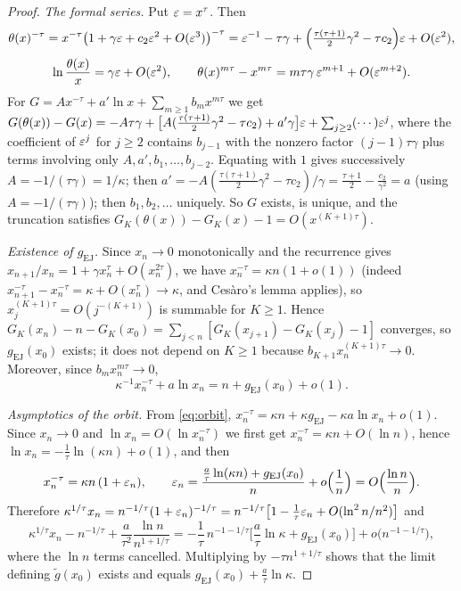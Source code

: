 \begin{proof}
\emph{The formal series.} Put $\varepsilon=x^\tau$. Then
\[
\theta(x)^{-\tau}=x^{-\tau}\big(1+\gamma\varepsilon+c_2\varepsilon^2+O(\varepsilon^3)\big)^{-\tau}=\varepsilon^{-1}-\tau\gamma+\Big(\tfrac{\tau(\tau+1)}2\gamma^2-\tau c_2\Big)\varepsilon+O(\varepsilon^2),
\]
\[
\ln\frac{\theta(x)}{x}=\gamma\varepsilon+O(\varepsilon^2),\qquad \theta(x)^{m\tau}-x^{m\tau}=m\tau\gamma\,\varepsilon^{m+1}+O(\varepsilon^{m+2}).
\]
For $G=Ax^{-\tau}+a'\ln x+\sum_{m\ge1}b_mx^{m\tau}$ we get $G(\theta(x))-G(x)=-A\tau\gamma+\big[A(\tfrac{\tau(\tau+1)}2\gamma^2-\tau c_2)+a'\gamma\big]\varepsilon+\sum_{j\ge2}(\cdots)\varepsilon^j$, where the coefficient of $\varepsilon^j$ for $j\ge2$ contains $b_{j-1}$ with the nonzero factor $(j-1)\tau\gamma$ plus terms involving only $A,a',b_1,\dots,b_{j-2}$. Equating with $1$ gives successively $A=-1/(\tau\gamma)=1/\kappa$; then $a'=-A(\tfrac{\tau(\tau+1)}2\gamma^2-\tau c_2)/\gamma=\tfrac{\tau+1}2-\tfrac{c_2}{\gamma^2}=a$ (using $A=-1/(\tau\gamma)$); then $b_1,b_2,\dots$ uniquely. So $G$ exists, is unique, and the truncation satisfies $G_K(\theta(x))-G_K(x)-1=O(x^{(K+1)\tau})$.

\emph{Existence of $g_{\mathrm{EJ}}$.} Since $x_n\to0$ monotonically and the recurrence gives $x_{n+1}/x_n=1+\gamma x_n^\tau+O(x_n^{2\tau})$, we have $x_n^{-\tau}=\kappa n(1+o(1))$ (indeed $x_{n+1}^{-\tau}-x_n^{-\tau}=\kappa+O(x_n^\tau)\to\kappa$, and Ces\`aro's lemma applies), so $x_j^{(K+1)\tau}=O(j^{-(K+1)})$ is summable for $K\ge1$. Hence $G_K(x_n)-n-G_K(x_0)=\sum_{j<n}[G_K(x_{j+1})-G_K(x_j)-1]$ converges, so $g_{\mathrm{EJ}}(x_0)$ exists; it does not depend on $K\ge1$ because $b_{K+1}x_n^{(K+1)\tau}\to0$. Moreover, since $b_mx_n^{m\tau}\to0$,
\begin{equation}\label{eq:orbit}
\kappa^{-1}x_n^{-\tau}+a\ln x_n=n+g_{\mathrm{EJ}}(x_0)+o(1).
\end{equation}

\emph{Asymptotics of the orbit.} From \eqref{eq:orbit}, $x_n^{-\tau}=\kappa n+\kappa g_{\mathrm{EJ}}-\kappa a\ln x_n+o(1)$. Since $x_n\to0$ and $\ln x_n=O(\ln x_n^{-\tau})$ we first get $x_n^{-\tau}=\kappa n+O(\ln n)$, hence $\ln x_n=-\tfrac1\tau\ln(\kappa n)+o(1)$, and then
\[
x_n^{-\tau}=\kappa n\,(1+\varepsilon_n),\qquad \varepsilon_n=\frac{\tfrac a\tau\ln(\kappa n)+g_{\mathrm{EJ}}(x_0)}{n}+o\Big(\frac1n\Big)=O\Big(\frac{\ln n}n\Big).
\]
Therefore $\kappa^{1/\tau}x_n=n^{-1/\tau}(1+\varepsilon_n)^{-1/\tau}=n^{-1/\tau}\big[1-\tfrac1\tau\varepsilon_n+O(\ln^2n/n^2)\big]$ and
\[
\kappa^{1/\tau}x_n-n^{-1/\tau}+\frac a{\tau^2}\frac{\ln n}{n^{1+1/\tau}}=-\frac1\tau\,n^{-1-1/\tau}\Big[\frac a\tau\ln\kappa+g_{\mathrm{EJ}}(x_0)\Big]+o\big(n^{-1-1/\tau}\big),
\]
where the $\ln n$ terms cancelled. Multiplying by $-\tau n^{1+1/\tau}$ shows that the limit defining $\tilde g(x_0)$ exists and equals $g_{\mathrm{EJ}}(x_0)+\tfrac a\tau\ln\kappa$. \end{proof}

